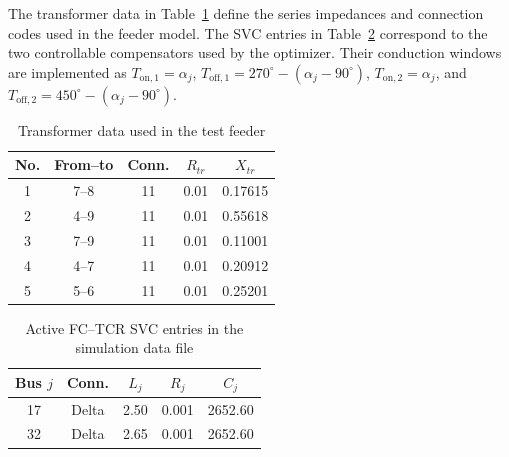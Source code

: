 \documentclass[journal]{IEEEtran}
\begin{document}
The transformer data in Table~\ref{tab:appendix_transformer_data} define the
series impedances and connection codes used in the feeder model. The SVC
entries in Table~\ref{tab:appendix_svc_data} correspond to the two controllable
compensators used by the optimizer. Their conduction windows are implemented as
$T_{\mathrm{on},1}=\alpha_j$, $T_{\mathrm{off},1}=270^\circ-(\alpha_j-90^\circ)$,
$T_{\mathrm{on},2}=\alpha_j$, and
$T_{\mathrm{off},2}=450^\circ-(\alpha_j-90^\circ)$.

\begin{table}[H]
\centering
\caption{Transformer data used in the test feeder}
\label{tab:appendix_transformer_data}
\setlength{\tabcolsep}{3pt}
\renewcommand{\arraystretch}{1.0}
\begin{tabular}{@{}ccccc@{}}
\toprule
No. & From--to & Conn. & $R_{tr}$ & $X_{tr}$ \\
\midrule
1 & 7--8 & 11 & 0.01 & 0.17615 \\
2 & 4--9 & 11 & 0.01 & 0.55618 \\
3 & 7--9 & 11 & 0.01 & 0.11001 \\
4 & 4--7 & 11 & 0.01 & 0.20912 \\
5 & 5--6 & 11 & 0.01 & 0.25201 \\
\bottomrule
\end{tabular}
\end{table}

\begin{table}[H]
\centering
\caption{Active FC--TCR SVC entries in the simulation data file}
\label{tab:appendix_svc_data}
\setlength{\tabcolsep}{3pt}
\renewcommand{\arraystretch}{1.0}
\begin{tabular}{@{}ccccc@{}}
\toprule
Bus $j$ & Conn. & $L_j$ & $R_j$ & $C_j$ \\
\midrule
17 & Delta & 2.50 & 0.001 & 2652.60 \\
32 & Delta & 2.65 & 0.001 & 2652.60 \\
\bottomrule
\end{tabular}
\end{table}
\end{document}
